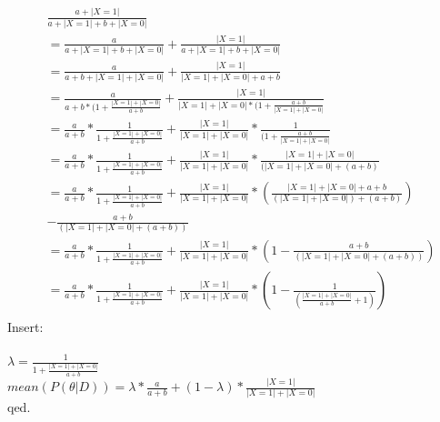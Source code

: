 \begin{align*}
&\frac{a+|X=1|}{a+|X=1|+b+|X=0|}  \\
&=\frac{a}{a+|X=1|+b+|X=0|} + \frac{|X=1|}{a+|X=1|+b+|X=0|}   \\
&=\frac{a}{a+b+|X=1|+|X=0|} + \frac{|X=1|}{|X=1|+|X=0|+a+b}   \\
&=\frac{a}{a+b*(1+\frac{|X=1|+|X=0|}{a+b}} + \frac{|X=1|}{|X=1|+|X=0|*(1+\frac{a+b}{|X=1|+|X=0|}}   \\
&=\frac{a}{a+b}*\frac{1}{1+\frac{|X=1|+|X=0|}{a+b}} + \frac{|X=1|}{|X=1|+|X=0|}*\frac{1}{(1+\frac{a+b}{|X=1|+|X=0|}}  \\
&=\frac{a}{a+b}*\frac{1}{1+\frac{|X=1|+|X=0|}{a+b}} + \frac{|X=1|}{|X=1|+|X=0|}*\frac{|X=1|+|X=0|}{(|X=1|+|X=0|+(a+b)}  \\
&=\frac{a}{a+b}*\frac{1}{1+\frac{|X=1|+|X=0|}{a+b}} + \frac{|X=1|}{|X=1|+|X=0|}*(\frac{|X=1|+|X=0|+a+b}{(|X=1|+|X=0|)+(a+b)}) \\ &-\frac{a+b}{(|X=1|+|X=0|+(a+b))}  \\
&=\frac{a}{a+b}*\frac{1}{1+\frac{|X=1|+|X=0|}{a+b}} + \frac{|X=1|}{|X=1|+|X=0|}*(1-\frac{a+b}{(|X=1|+|X=0|+(a+b))})  \\
&=\frac{a}{a+b}*\frac{1}{1+\frac{|X=1|+|X=0|}{a+b}} + \frac{|X=1|}{|X=1|+|X=0|}*(1-\frac{1}{(\frac{|X=1|+|X=0|}{a+b}+1)})  \\
\end{align*}
Insert: \\
\\
$\lambda = \frac{1}{1+\frac{|X=1|+|X=0|}{a+b}}$ \\
$ mean(P(\theta | D )) = \lambda * \frac{a}{a+b} + (1-\lambda ) * \frac{|X=1|}{|X=1|+|X=0|} $ \\

qed.

